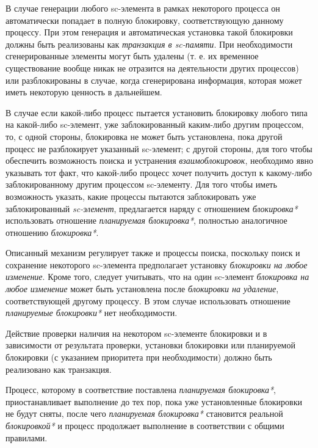 В случае генерации любого sc-элемента в рамках некоторого процесса он автоматически попадает в полную блокировку, соответствующую данному процессу. При этом генерация и автоматическая установка такой блокировки должны быть реализованы как \textit{транзакция в sc-памяти}. При необходимости сгенерированные элементы могут быть удалены (т. е. их временное существование вообще никак не отразится на деятельности других процессов) или разблокированы в случае, когда сгенерирована информация, которая может иметь некоторую ценность в дальнейшем.

В случае если какой-либо процесс пытается установить блокировку любого типа на какой-либо sc-элемент, уже заблокированный каким-либо другим процессом, то, с одной стороны, блокировка не может быть установлена, пока другой процесс не разблокирует указанный sc-элемент; с другой стороны, для того чтобы обеспечить возможность поиска и устранения \textit{взаимоблокировок}, необходимо явно указывать тот факт, что какой-либо процесс хочет получить доступ к какому-либо заблокированному другим процессом sc-элементу. Для того чтобы иметь возможность указать, какие процессы пытаются заблокировать уже заблокированный \textit{sc-элемент}, предлагается наряду с отношением \textit{блокировка*} использовать отношение \textit{планируемая блокировка*}, полностью аналогичное отношению \textit{блокировка*}.
	
Описанный механизм регулирует также и процессы поиска, поскольку поиск и сохранение некоторого sc-элемента предполагает установку \textit{блокировки на любое изменение}. Кроме того, следует учитывать, что на один sc-элемент \textit{блокировка на любое изменение} может быть установлена после \textit{блокировки на удаление}, соответствующей другому процессу. В этом случае использовать отношение \textit{планируемые блокировки*} нет необходимости.
	
Действие проверки наличия на некотором sc-элементе блокировки и в зависимости от результата проверки, установки блокировки или планируемой блокировки (с указанием приоритета при необходимости) должно быть реализовано как транзакция.

\begin{SCn}
\end{SCn}

Процесс, которому в соответствие поставлена \textit{планируемая блокировка*}, приостанавливает выполнение до тех пор, пока уже установленные блокировки не будут сняты, после чего \textit{планируемая блокировка*} становится реальной \textit{блокировкой*} и процесс продолжает выполнение в соответствии с общими правилами.

